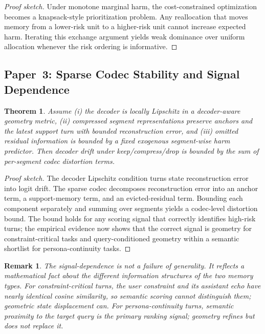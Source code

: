 \documentclass[conference]{IEEEtran}
\newtheorem{theorem}{Theorem}
\newtheorem{remark}{Remark}
\begin{document}
\begin{proof}[Proof sketch]
Under monotone marginal harm, the cost-constrained optimization becomes a knapsack-style prioritization problem. Any reallocation that moves memory from a lower-risk unit to a higher-risk unit cannot increase expected harm. Iterating this exchange argument yields weak dominance over uniform allocation whenever the risk ordering is informative.
\end{proof}

\subsection{Paper~3: Sparse Codec Stability and Signal Dependence}
\begin{theorem}
Assume (i) the decoder is locally Lipschitz in a decoder-aware geometry metric, (ii) compressed segment representations preserve anchors and the latest support turn with bounded reconstruction error, and (iii) omitted residual information is bounded by a fixed exogenous segment-wise harm predictor. Then decoder drift under keep/compress/drop is bounded by the sum of per-segment codec distortion terms.
\end{theorem}

\begin{proof}[Proof sketch]
The decoder Lipschitz condition turns state reconstruction error into logit drift. The sparse codec decomposes reconstruction error into an anchor term, a support-memory term, and an evicted-residual term. Bounding each component separately and summing over segments yields a codec-level distortion bound. The bound holds for any scoring signal that correctly identifies high-risk turns; the empirical evidence now shows that the correct signal is geometry for constraint-critical tasks and query-conditioned geometry within a semantic shortlist for persona-continuity tasks.
\end{proof}

\begin{remark}
The signal-dependence is not a failure of generality. It reflects a mathematical fact about the different information structures of the two memory types. For constraint-critical turns, the user constraint and its assistant echo have nearly identical cosine similarity, so semantic scoring cannot distinguish them; geometric state displacement can. For persona-continuity turns, semantic proximity to the target query is the primary ranking signal; geometry refines but does not replace it.
\end{remark}
\end{document}
